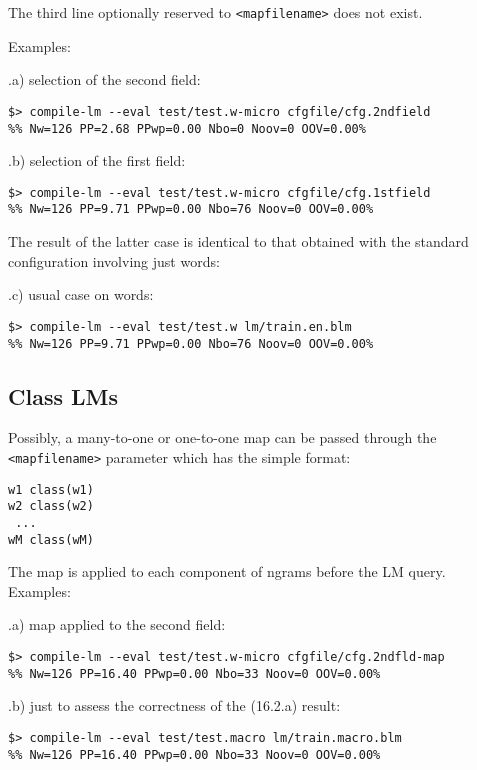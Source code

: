 \noindent The third line optionally reserved to {\tt <mapfilename>} does not exist.

\bigskip
\noindent
Examples:

\bigskip
\noindent
\thesubsection.a) selection of the second field:
\begin{verbatim}
$> compile-lm --eval test/test.w-micro cfgfile/cfg.2ndfield
%% Nw=126 PP=2.68 PPwp=0.00 Nbo=0 Noov=0 OOV=0.00%
\end{verbatim}

\noindent
\thesubsection.b) selection of the first field:
\begin{verbatim}
$> compile-lm --eval test/test.w-micro cfgfile/cfg.1stfield
%% Nw=126 PP=9.71 PPwp=0.00 Nbo=76 Noov=0 OOV=0.00%
\end{verbatim}

\noindent The result of the latter case is identical to that obtained with
the standard configuration involving just words:

\bigskip
\noindent
\thesubsection.c) usual case on words:
\begin{verbatim}
$> compile-lm --eval test/test.w lm/train.en.blm 
%% Nw=126 PP=9.71 PPwp=0.00 Nbo=76 Noov=0 OOV=0.00%
\end{verbatim}


\subsection{Class LMs}

Possibly, a many-to-one or one-to-one map can be passed through the
{\tt <mapfilename>} parameter which has the simple format:

\begin{verbatim}
w1 class(w1)
w2 class(w2)
 ...
wM class(wM)
\end{verbatim}


\noindent The map is applied to each component of ngrams before the LM
query. Examples:
\bigskip

\noindent \thesubsection.a) map applied to the second field:
\begin{verbatim}
$> compile-lm --eval test/test.w-micro cfgfile/cfg.2ndfld-map
%% Nw=126 PP=16.40 PPwp=0.00 Nbo=33 Noov=0 OOV=0.00%
\end{verbatim}



\noindent \thesubsection.b) just to assess the correctness of the (16.2.a) result:
\begin{verbatim}
$> compile-lm --eval test/test.macro lm/train.macro.blm
%% Nw=126 PP=16.40 PPwp=0.00 Nbo=33 Noov=0 OOV=0.00%


\end{verbatim}


